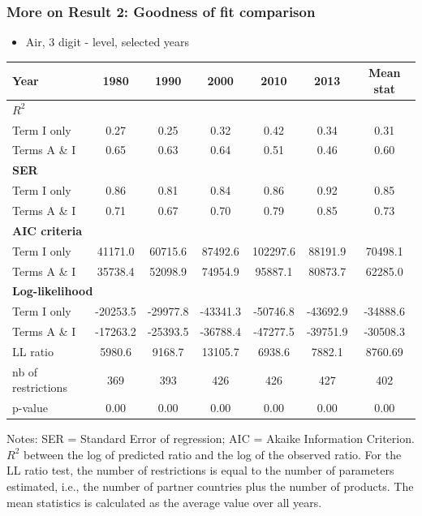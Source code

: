 \documentclass[10 pt,Helvetica, french]{beamer}
\begin{document}
\begin{frame}[label=app_goodnessfit]
\frametitle{More on Result 2: Goodness of fit comparison}
\begin{itemize}
\item Air, 3 digit - level, selected years
\end{itemize}
\begin{table}[htbp]
  \centering
  \scriptsize{
\begin{center}
    \begin{tabular}{l|ccccc|c}
    \hline \hline
    Year  &1980  & 1990  & 2000  & 2010 & 2013 & Mean stat \\ \hline
    \multicolumn{7}{l}{\bf{$R^2$} }\\ \hline
    Term I only &  0.27  & 0.25  & 0.32  & 0.42 & 0.34 & 0.31 \\
    Terms A \& I &  0.65  & 0.63  & 0.64  & 0.51 & 0.46 & 0.60 \\ \hline
    \multicolumn{7}{l}{\textbf{SER}  }  \\ \hline
    Term I only &  0.86  & 0.81  & 0.84  & 0.86 & 0.92 & 0.85 \\
    Terms A \& I &  0.71  & 0.67  & 0.70  & 0.79 & 0.85 & 0.73 \\ \hline
   \multicolumn{7}{l}{\textbf{AIC criteria}}  \\ \hline
    Term I only &  41171.0 & 60715.6 & 87492.6 & 102297.6 & 88191.9 & 70498.1 \\
    Terms A \& I & 35738.4 & 52098.9 & 74954.9 & 95887.1 & 80873.7 & 62285.0 \\ \hline
    \multicolumn{7}{l}{\textbf{Log-likelihood}} \\ \hline
    Term I only &  -20253.5 & -29977.8 & -43341.3 & -50746.8 & -43692.9 & -34888.6 \\
    Terms A \& I &  -17263.2 & -25393.5 & -36788.4 & -47277.5 & -39751.9 & -30508.3 \\
    LL ratio &  5980.6 & 9168.7 & 13105.7 & 6938.6 & 7882.1 & 8760.69 \\
    nb of restrictions & 369   & 393   & 426   & 426 & 427 & 402 \\
    p-value & 0.00 & 0.00 & 0.00 & 0.00 & 0.00 & 0.00 \\
    \hline \hline
 \end{tabular}%
    \end{center}}
  \label{tab:good_fit_air}%
 \parbox[l]{10cm}{\tiny{Notes: SER = Standard Error of regression; AIC = Akaike Information Criterion. $R^{2}$ between the log of predicted ratio and the log of the observed ratio. For the LL ratio test, the number of restrictions is equal to the number of parameters estimated, i.e., the number of partner countries plus the number of products. The mean statistics is calculated as the average value over all years. }}
\end{table}%
\hyperlink{slide_goodnessfit}{}
\end{frame}
\end{document}
